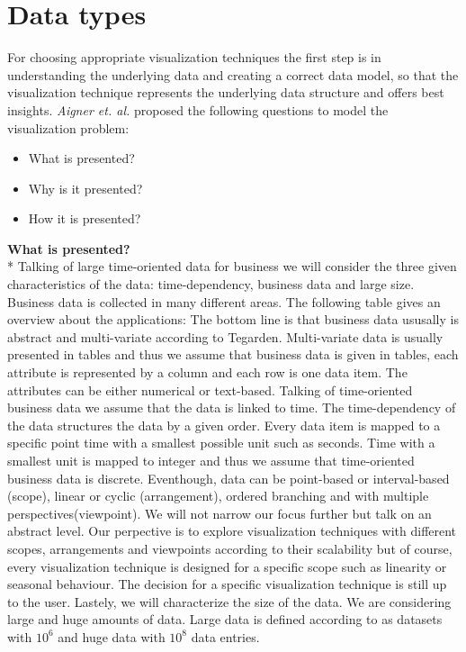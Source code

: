 \section{Data types}
For choosing appropriate visualization techniques the first step is in understanding the underlying data and creating a correct data model\cite{Aigner2011}, so that the visualization technique represents the underlying data structure and offers best insights\cite{Bacic}. \textit{Aigner et. al.} proposed  the following questions to model the visualization problem: 
\begin{itemize}
    \item What is presented?
    \item Why is it presented?
    \item How it is presented?
\end{itemize}
\textbf{What is presented?}\\*
Talking of large time-oriented data for business we will consider the three given characteristics of the data: time-dependency, business data and large size. Business data is collected in many different areas. The following table gives an overview about the applications: 
The bottom line is that business data ususally is abstract and multi-variate according to Tegarden\cite{Tegarden1999a}. Multi-variate data is usually presented in tables\cite{Borgo2013} and thus we assume that business data is given in tables, each attribute is represented by a column and each row is one data item. The attributes can be either numerical or text-based. 
Talking of time-oriented business data we assume that the data is linked to time. The time-dependency of the data structures the data by a given order. Every data item is mapped to a specific point time with a smallest possible unit such as seconds. Time with a smallest unit is mapped to integer\cite{Aigner2011} and thus we assume that time-oriented business data is discrete. Eventhough, data can be point-based or interval-based (scope), linear or cyclic (arrangement), ordered branching and with multiple perspectives(viewpoint)\cite{Aigner2011}. We will not narrow our focus further but talk on an abstract level. Our perpective is to explore visualization techniques with different scopes, arrangements and viewpoints according to their scalability but of course, every visualization technique is designed for a specific scope such as linearity or seasonal behaviour. The decision for a specific visualization technique is still up to the user. 
Lastely, we will characterize the size of the data. We are considering large and huge amounts of data. Large data is defined according to\cite{Huber1994} as datasets with $10^6$ and huge data with $10^8$ data entries.


